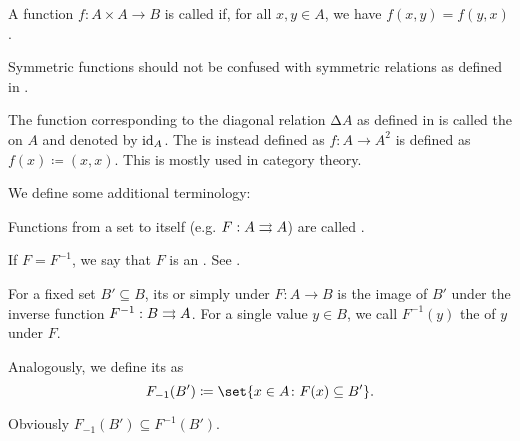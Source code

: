 \begin{definition}
\begin{thmenum}[resume=def:multi_valued_function]
     A function \( f: A \times A \to B \) is called  if, for all \( x, y \in A \), we have \( f(x, y) = f(y, x) \).

    Symmetric functions should not be confused with symmetric relations as defined in .

     The function corresponding to the diagonal relation \( \increment A \) as defined in  is called the  on \( A \) and denoted by \( \operatorname{id}_A \). The  is instead defined as \( f: A \to A^2 \) is defined as \( f(x) \coloneqq (x, x) \). This is mostly used in category theory.
  \end{thmenum}

  We define some additional terminology:
  \begin{thmenum}[resume=def:multi_valued_function]
     Functions from a set to itself (e.g. \( F: A \rightrightarrows A \)) are called .

     If \( F = F^{-1} \), we say that \( F \) is an . See .

     For a fixed set \( B' \subseteq B \), its  or simply  under \( F: A \to B \) is the image of \( B' \) under the inverse function \( F^{-1}: B \rightrightarrows A \). For a single value \( y \in B \), we call \( F^{-1}(y) \) the  of \( y \) under \( F \).

     Analogously, we define its  as
    \begin{equation*}
      F_{-1}(B') \coloneqq \set{ x \in A \colon F(x) \subseteq B' }.
    \end{equation*}

    Obviously \( F_{-1}(B') \subseteq F^{-1}(B') \).
  \end{thmenum}
\end{definition}

